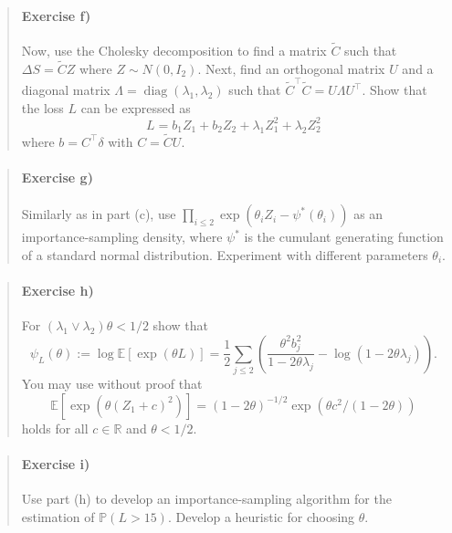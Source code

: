 \documentclass[11pt]{article}
\begin{document}
    \begin{quote}
\mbox{}%
\paragraph{Exercise f)}\label{exercise-f}

Now, use the Cholesky decomposition to find a matrix \(\widetilde{C}\)
such that \(\Delta S=\widetilde{C} Z\) where
\(Z \sim N\left(0, I_2\right)\). Next, find an orthogonal matrix \(U\)
and a diagonal matrix
\(\Lambda=\operatorname{diag}\left(\lambda_1, \lambda_2\right)\) such
that \(\widetilde{C}^{\top} \widetilde{C}=U \Lambda U^{\top}\). Show
that the loss \(L\) can be expressed as
\[ L=b_1 Z_1+b_2 Z_2+\lambda_1 Z_1^2+\lambda_2 Z_2^2 \] where
\(b=C^{\top} \delta\) with \(C=\widetilde{C} U\).
\end{quote}

    \begin{quote}
\mbox{}%
\paragraph{Exercise g)}\label{exercise-g}

Similarly as in part (c), use
\(\prod_{i \leq 2} \exp \left(\theta_i Z_i-\psi^*\left(\theta_i\right)\right)\)
as an importance-sampling density, where \(\psi^*\) is the cumulant
generating function of a standard normal distribution. Experiment with
different parameters \(\theta_i\).
\end{quote}

    \begin{quote}
\mbox{}%
\paragraph{Exercise h)}\label{exercise-h}

For \(\left(\lambda_1 \vee \lambda_2\right) \theta<1 / 2\) show that
\[\psi_L(\theta):=\log \mathbb{E}[\exp (\theta L)]=\frac{1}{2} \sum_{j \leq 2}\left(\frac{\theta^2 b_j^2}{1-2 \theta \lambda_j}-\log \left(1-2 \theta \lambda_j\right)\right) .\]
You may use without proof that
\[\mathbb{E}\left[\exp \left(\theta\left(Z_1+c\right)^2\right)\right]=(1-2 \theta)^{-1 / 2} \exp \left(\theta c^2 /(1-2 \theta)\right)\]
holds for all \(c \in \mathbb{R}\) and \(\theta<1 / 2\).
\end{quote}

    \begin{quote}
\mbox{}%
\paragraph{Exercise i)}\label{exercise-i}

Use part (h) to develop an importance-sampling algorithm for the
estimation of \(\mathbb{P}(L>15)\). Develop a heuristic for choosing
\(\theta\).
\end{quote}
\end{document}
